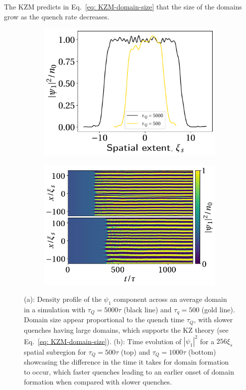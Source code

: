 The KZM predicts in Eq.~\eqref{eq: KZM-domain-size} that the size of the domains
grow as the quench rate decreases.
\begin{figure}[tb]
    \centering
    \begin{subfigure}{0.49\textwidth}
        \includegraphics[width=\textwidth]{gfx/ch-spin1/BA-FM_domain_width.pdf}
        \caption{\label{fig: BA-FM-domain-width-comparison}}
    \end{subfigure}
    \begin{subfigure}{0.49\textwidth}
        \includegraphics[width=\textwidth]{gfx/ch-spin1/BA-FM_domain_onset.png}
        \caption{\label{fig: BA-FM-domain-onset}}
    \end{subfigure}
    \caption[Density profile across an average FM domain]
    {(a): Density profile of the \(\psi_1\) component across an average
        domain in a simulation with \(\tau_Q=5000\tau \) (black line) and
        \(\tau_q=500\) (gold line).
        Domain size appear proportional to the quench time \(\tau_Q\), with
        slower quenches having large domains, which supports the KZ theory
        (see Eq.~\eqref{eq: KZM-domain-size}).
        (b): Time evolution of \( |\psi_1|^2\) for a \(256\xi_s\) spatial
        subregion for \( \tau_Q=500\tau \) (top) and \(\tau_Q=1000\tau \)
        (bottom) showcasing the difference in the time it takes for domain
        formation to occur, which faster quenches leading to an earlier onset
        of domain formation when compared with slower quenches.}
\end{figure}
